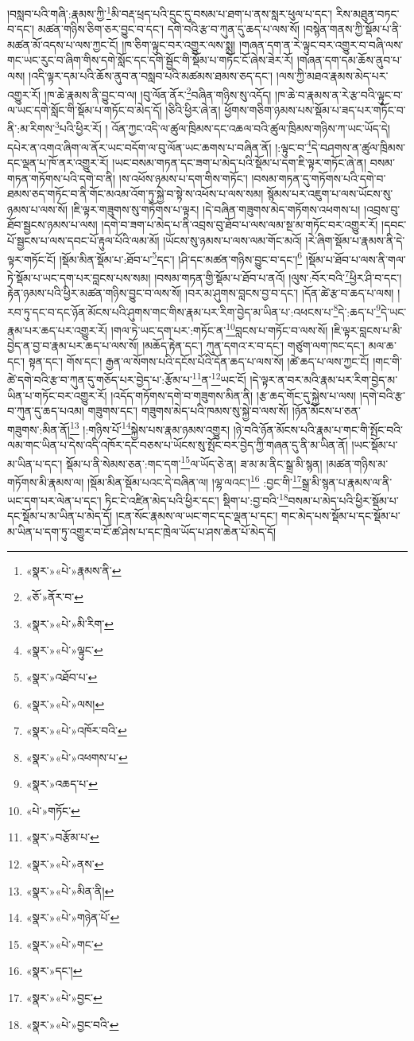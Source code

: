 །བསླབ་པའི་གཞི་:རྣམས་ཀྱི་\footnote{«སྣར་»«པེ་»རྣམས་ནི་}མི་བརྡ་ཕྲད་པའི་དྲུང་དུ་བསམ་པ་ཐག་པ་ནས་སླར་ཕུལ་པ་དང་། རིས་མཐུན་བཏང་བ་དང་། མཚན་གཉིས་ཅིག་ཅར་བྱུང་བ་དང་། དགེ་བའི་རྩ་བ་ཀུན་དུ་ཆད་པ་ལས་སོ། །བསྙེན་གནས་ཀྱི་སྡོམ་པ་ནི་མཚན་མོ་འདས་པ་ལས་ཀྱང་ངོ། །ཁ་ཅིག་ལྟུང་བར་འགྱུར་ལས་སྨྲ། །གཞན་དག་ན་རེ་ལྟུང་བར་འགྱུར་བ་བཞི་ལས་གང་ཡང་རུང་བ་ཞིག་གིས་དགེ་སློང་དང་དགེ་སྦྱོང་གི་སྡོམ་པ་གཏོང་ངོ་ཞེས་ཟེར་རོ། །གཞན་དག་དམ་ཆོས་ནུབ་པ་ལས། །འདི་ལྟར་དམ་པའི་ཆོས་ནུབ་ན་བསླབ་པའི་མཚམས་ཐམས་ཅད་དང་། །ལས་ཀྱི་མཐའ་རྣམས་མེད་པར་འགྱུར་རོ། །ཁ་ཆེ་རྣམས་ནི་བྱུང་བ་ལ། །བུ་ལོན་ནོར་\footnote{«ཅོ་»ནོར་བ་}བཞིན་གཉིས་སུ་འདོད། །ཁ་ཆེ་བ་རྣམས་ན་རེ་རྩ་བའི་ལྟུང་བ་ལ་ཡང་དགེ་སློང་གི་སྡོམ་པ་གཏོང་བ་མེད་དོ། །ཅིའི་ཕྱིར་ཞེ་ན། ཕྱོགས་གཅིག་ཉམས་པས་སྡོམ་པ་ཟད་པར་གཏོང་བ་ནི་:མ་རིགས་\footnote{«སྣར་»«པེ་»མི་རིག་}པའི་ཕྱིར་རོ། །
འོན་ཀྱང་འདི་ལ་ཚུལ་ཁྲིམས་དང་འཆལ་བའི་ཚུལ་ཁྲིམས་གཉིས་ཀ་ཡང་ཡོད་དེ། དཔེར་ན་འགའ་ཞིག་ལ་ནོར་ཡང་བདོག་ལ་བུ་ལོན་ཡང་ཆགས་པ་བཞིན་ནོ། །:ལྟུང་བ་\footnote{«སྣར་»«པེ་»ལྟུང་}དེ་བཤགས་ན་ཚུལ་ཁྲིམས་དང་ལྡན་པ་ཁོ་ནར་འགྱུར་རོ། །ཡང་བསམ་གཏན་དང་ཟག་པ་མེད་པའི་སྡོམ་པ་དག་ཇི་ལྟར་གཏོང་ཞེ་ན། བསམ་གཏན་གཏོགས་པའི་དགེ་བ་ནི། །ས་འཕོས་ཉམས་པ་དག་གིས་གཏོང་། །བསམ་གཏན་དུ་གཏོགས་པའི་དགེ་བ་ཐམས་ཅད་གཏོང་བ་ནི་གོང་མའམ་འོག་ཏུ་སྐྱེ་བ་སྟེ་ས་འཕོས་པ་ལས་སམ། སྙོམས་པར་འཇུག་པ་ལས་ཡོངས་སུ་ཉམས་པ་ལས་སོ། །ཇི་ལྟར་གཟུགས་སུ་གཏོགས་པ་ལྟར། །དེ་བཞིན་གཟུགས་མེད་གཏོགས་འཕགས་པ། །འབྲས་བུ་ཐོབ་སྦྱངས་ཉམས་པ་ལས། །དགེ་བ་ཟག་པ་མེད་པ་ནི་འབྲས་བུ་ཐོབ་པ་ལས་ལམ་སྔ་མ་གཏོང་བར་འགྱུར་རོ། །དབང་པོ་སྦྱངས་པ་ལས་དབང་པོ་རྟུལ་པོའི་ལམ་མོ། །ཡོངས་སུ་ཉམས་པ་ལས་ལམ་གོང་མའོ། །རེ་ཞིག་སྡོམ་པ་རྣམས་ནི་དེ་ལྟར་གཏོང་ངོ། །སྡོམ་མིན་སྡོམ་པ་:ཐོབ་པ་\footnote{«སྣར་»འཐོབ་པ་}དང་། །ཤི་དང་མཚན་གཉིས་བྱུང་བ་དང་།\footnote{«སྣར་»«པེ་»ལས།} །སྡོམ་པ་ཐོབ་པ་ལས་ནི་གལ་ཏེ་སྡོམ་པ་ཡང་དག་པར་བླངས་པས་སམ། །བསམ་གཏན་གྱི་སྡོམ་པ་ཐོབ་པ་ནའོ། །ལུས་:བོར་བའི་\footnote{«སྣར་»«པེ་»འཁོར་བའི་}ཕྱིར་ཤི་བ་དང་། རྟེན་ཉམས་པའི་ཕྱིར་མཚན་གཉིས་བྱུང་བ་ལས་སོ། །བར་མ་ཤུགས་བླངས་བྱ་བ་དང་། །དོན་ཚེ་རྩ་བ་ཆད་པ་ལས། །རབ་ཏུ་དང་བ་དང་ཉོན་མོངས་པའི་ཤུགས་གང་གིས་རྣམ་པར་རིག་བྱེད་མ་ཡིན་པ་:འཕངས་པ་\footnote{«སྣར་»«པེ་»འཕགས་པ་}དེ་:ཆད་པ་\footnote{«སྣར་»འཆད་པ་}དེ་ཡང་རྣམ་པར་ཆད་པར་འགྱུར་རོ། །གལ་ཏེ་ཡང་དག་པར་:གཏོང་ན་\footnote{«པེ་»གཏོང་}བླངས་པ་གཏོང་བ་ལས་སོ། །ཇི་ལྟར་བླངས་པ་མི་བྱེད་ན་བྱ་བ་རྣམ་པར་ཆད་པ་ལས་སོ། །མཆོད་རྟེན་དང་། ཀུན་དགའ་ར་བ་དང་། གཙུག་ལག་ཁང་དང་། མལ་ཆ་དང་། སྟན་དང་། གོས་དང་། རྒྱན་ལ་སོགས་པའི་དངོས་པོའི་དོན་ཆད་པ་ལས་སོ། །ཚེ་ཆད་པ་ལས་ཀྱང་ངོ། །གང་གི་ཚེ་དགེ་བའི་རྩ་བ་ཀུན་དུ་གཅོད་པར་བྱེད་པ་:རྩོམ་པ་\footnote{«སྣར་»བརྩོམ་པ་}ན་\footnote{«སྣར་»«པེ་»ནས་}ཡང་ངོ། །དེ་ལྟར་ན་བར་མའི་རྣམ་པར་རིག་བྱེད་མ་ཡིན་པ་གཏོང་བར་འགྱུར་རོ། །འདོད་གཏོགས་དགེ་བ་གཟུགས་མིན་ནི། །རྩ་ཆད་གོང་དུ་སྐྱེས་པ་ལས། །དགེ་བའི་རྩ་བ་ཀུན་དུ་ཆད་པའམ། གཟུགས་དང་། གཟུགས་མེད་པའི་ཁམས་སུ་སྐྱེ་བ་ལས་སོ། །ཉོན་མོངས་པ་ཅན་གཟུགས་:མིན་ནོ།\footnote{«སྣར་»«པེ་»མིན་ནི།} །:གཉིས་པོ་\footnote{«སྣར་»«པེ་»གཉེན་པོ་}སྐྱེས་པས་རྣམ་ཉམས་འགྱུར། །ཉེ་བའི་ཉོན་མོངས་པའི་རྣམ་པ་གང་གི་སྤོང་བའི་ལམ་གང་ཡིན་པ་དེས་འདི་འཁོར་དང་བཅས་པ་ཡོངས་སུ་སྤོང་བར་བྱེད་ཀྱི་གཞན་དུ་ནི་མ་ཡིན་ནོ། །ཡང་སྡོམ་པ་མ་ཡིན་པ་དང་། སྡོམ་པ་ནི་སེམས་ཅན་:གང་དག་\footnote{«སྣར་»«པེ་»གང་}ལ་ཡོད་ཅེ་ན། ཟ་མ་མ་ནིང་སྒྲ་མི་སྙན། །མཚན་གཉིས་མ་གཏོགས་མི་རྣམས་ལ། །སྡོམ་མིན་སྡོམ་པའང་དེ་བཞིན་ལ། །ལྷ་ལའང་།\footnote{«སྣར་»དང་།} :བྱང་གི་\footnote{«སྣར་»«པེ་»བྱང་}སྒྲ་མི་སྙན་པ་རྣམས་ལ་ནི་ཡང་དག་པར་ལེན་པ་དང་། ཏིང་ངེ་འཛིན་མེད་པའི་ཕྱིར་དང་། སྡིག་པ་:བྱ་བའི་\footnote{«སྣར་»«པེ་»བྱང་བའི་}བསམ་པ་མེད་པའི་ཕྱིར་སྡོམ་པ་དང་སྡོམ་པ་མ་ཡིན་པ་མེད་དོ། །ངན་སོང་རྣམས་ལ་ཡང་གང་དང་ལྡན་པ་དང་། གང་མེད་པས་སྡོམ་པ་དང་སྡོམ་པ་མ་ཡིན་པ་དག་ཏུ་འགྱུར་བ་ངོ་ཚ་ཤེས་པ་དང་ཁྲེལ་ཡོད་པ་ཤས་ཆེན་པོ་མེད་དོ། 
